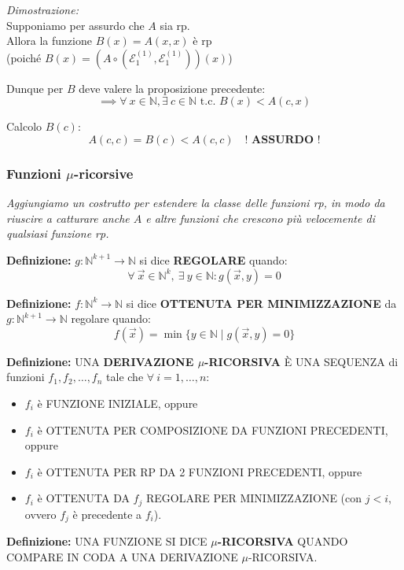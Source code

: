 \textit{Dimostrazione:} \\
Supponiamo per assurdo che $A$ sia rp. \\
Allora la funzione $B(x) = A(x,x)$ è rp \\
(poiché $B(x) = (A \circ (\mathcal{E}_1^{(1)}, \mathcal{E}_1^{(1)}))(x)$)

Dunque per $B$ deve valere la proposizione precedente:
$$ \implies \forall\ x \in \mathbb{N}, \exists\ c \in \mathbb{N} \text{ t.c. } B(x) < A(c, x) $$

Calcolo $B(c)$:
$$ A(c,c) = B(c) < A(c,c) \quad \textbf{! ASSURDO !} $$




\subsubsection{Funzioni $\mu$-ricorsive}
\textit{Aggiungiamo un costrutto per estendere la classe delle funzioni rp, in modo da riuscire a catturare anche $A$ e altre funzioni che crescono più velocemente di qualsiasi funzione rp.}

\vspace{0.4cm}
\textbf{Definizione:} $g: \mathbb{N}^{k+1} \to \mathbb{N}$ si dice \textbf{REGOLARE} quando:
$$ \forall\ \vec{x} \in \mathbb{N}^k, \ \exists\ y \in \mathbb{N} : g(\vec{x}, y) = 0 $$

\vspace{0.4cm}
\textbf{Definizione:} $f: \mathbb{N}^k \to \mathbb{N}$ si dice \textbf{OTTENUTA PER MINIMIZZAZIONE} da $g: \mathbb{N}^{k+1} \to \mathbb{N}$ regolare quando:
$$ f(\vec{x}) = \min \{ y \in \mathbb{N} \mid g(\vec{x}, y) = 0 \} $$

\vspace{0.4cm}
\textbf{Definizione:} UNA \textbf{DERIVAZIONE $\mu$-RICORSIVA} È UNA SEQUENZA di funzioni $f_1, f_2, \dots, f_n$ tale che $\forall\ i = 1, \dots, n$:
\begin{itemize}
    \item $f_i$ è FUNZIONE INIZIALE, oppure
    \item $f_i$ è OTTENUTA PER COMPOSIZIONE DA FUNZIONI PRECEDENTI, oppure
    \item $f_i$ è OTTENUTA PER RP DA 2 FUNZIONI PRECEDENTI, oppure
    \item $f_i$ è OTTENUTA DA $f_j$ REGOLARE PER MINIMIZZAZIONE (con $j < i$, ovvero $f_j$ è precedente a $f_i$).
\end{itemize}

\vspace{0.4cm}
\textbf{Definizione:} UNA FUNZIONE SI DICE \textbf{$\mu$-RICORSIVA} QUANDO COMPARE IN CODA A UNA DERIVAZIONE $\mu$-RICORSIVA.

